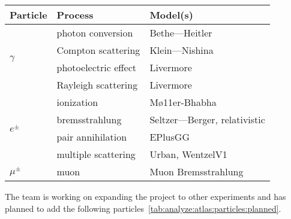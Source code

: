 \begin{table}[ht]
    \centering
    \begin{tabular}{lll}
        \hline
        \textbf{Particle}         & \textbf{Process}     & \textbf{Model(s)}            \\
        \hline
        \multirow{4}{*}{$\gamma$} & photon conversion    & Bethe—Heitler                \\
                                  & Compton scattering   & Klein—Nishina                \\
                                  & photoelectric effect & Livermore                    \\
                                  & Rayleigh scattering  & Livermore                    \\
        \hline
        \multirow{4}{*}{$e^\pm$}  & ionization           & Mø11er-Bhabha                \\
                                  & bremsstrahlung       & Seltzer—Berger, relativistic \\
                                  & pair annihilation    & EPlusGG                      \\
                                  & multiple scattering  & Urban, WentzelV1             \\
        \hline
        $\mu^\pm$                 & muon                 & Muon Bremsstrahlung          \\
        \hline
    \end{tabular}
    \label{tab:analyze:atlas:particles:implemented}
\end{table}

The team is working on expanding the project to other experiments and has planned
to add the following particles~\ref{tab:analyze:atlas:particles:planned}.

